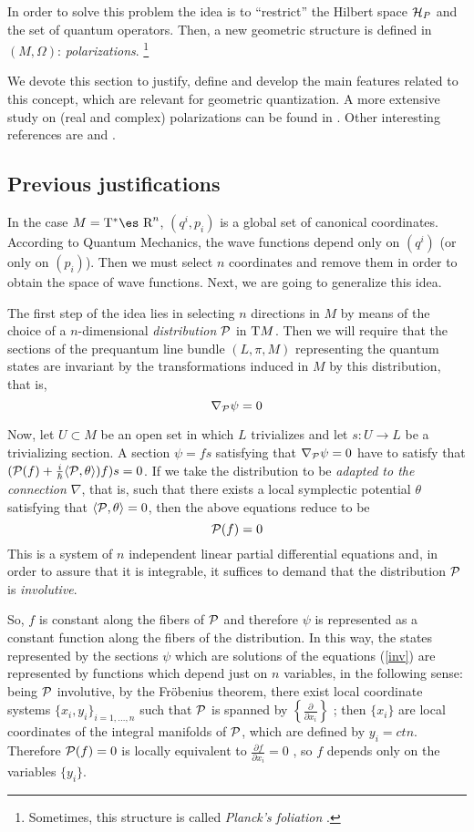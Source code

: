 \documentclass[12pt]{article}
\def\beq{\begin{equation}}
\def\eeq{\end{equation}}
\def\dst{\(}
\def\derpar#1#2{\frac{\partial{#1}}{\partial{#2}}}
\def\P{{\cal P}}
\def\H{{\cal H}}
\def\Real{\mbox{\es R}}
\def\Tan{{\rm T}}
\begin{document}
In order to solve this problem the idea is to ``restrict'' the Hilbert
space $\H_P$
and the set of quantum operators. Then, a new geometric structure is
defined in
$(M,\Omega )$: {\it polarizations}.%
\footnote{Sometimes, this structure is called {\it Planck's foliation}
\cite{AM-78}.
}

We devote this section to justify, define and develop the main features
related to this concept, which are relevant for geometric quantization.
A more extensive study on (real and complex) polarizations can be found
in \cite{Wo-80}.
Other interesting references are \cite{Sn-80} and \cite{Tu-85}.


\subsection{Previous justifications}


In the case $M=\Tan^*\Real^n$,
$(q^i,p_i)$ is a global set of canonical coordinates.
According to Quantum Mechanics, the wave functions
depend only on $(q^i)$ (or only on $(p_i)$).
Then we must select $n$ coordinates and remove them
in order to obtain the space of wave functions.
Next, we are going to generalize this idea.

The first step of the idea lies in selecting
$n$ directions in $M$ by means of the choice of a
$n$-dimensional {\it distribution} $\P$ in $\Tan M$.
Then we will require that the sections of
the prequantum line bundle $(L,\pi ,M)$ representing the quantum states
are invariant by the transformations
induced in $M$ by this distribution, that is,
\beq
\nabla_\P \psi = 0
\label{inv}
\eeq

Now, let $U \subset M$ be an open set
in which $L$ trivializes and let
$s \colon U \to L$ be a trivializing section.
A section $\psi = f s$ satisfying that
$\nabla_\P \psi = 0$
have to satisfy that
$(\P (f) + \frac{i}{\hbar}\langle \P,\theta \rangle )f)s = 0$.
If we take the distribution to be
{\it adapted to the connection $\nabla$},
that is, such that there exists
a local symplectic potential $\theta$ satisfying that
$\langle \P ,\theta \rangle = 0$,
then the above equations reduce to be
$$
\P (f) = 0
$$
This is a system of
$n$ independent linear partial differential equations and,
in order to assure that it is integrable,
it suffices to demand that the distribution $\P$
is {\it involutive}.

So, $f$ is constant along the fibers of $\P$
and therefore $\psi$ is represented as a constant function
along the fibers of the distribution.
In this way, the states represented by the sections $\psi$
which are solutions of the equations
(\ref{inv})
are represented by functions which
depend just on $n$ variables, in the following sense:
being $\P$ involutive, by the Fr\"obenius theorem,
there exist local coordinate systems
$\{ x_i,y_i \}_{i=1,\ldots ,n}$
such that $\P$ is spanned by
\dst\left\{ \derpar{}{x_i} \right\}\) ; then
$\{ x_i \}$ are local coordinates of the integral manifolds of $\P$,
which are defined by $y_i=ctn.$
Therefore $\P (f) = 0$ is locally equivalent to
 \dst\derpar{f}{x_i} = 0\) , so $f$ depends only
 on the variables $\{ y_i\}$.
\end{document}
